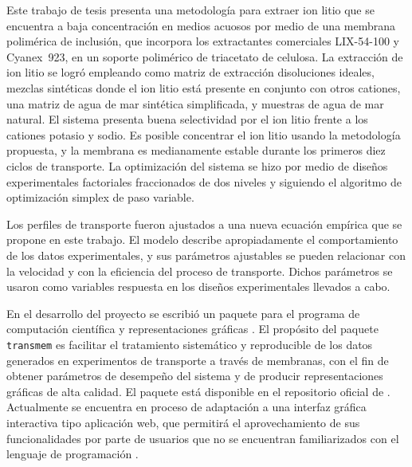 
\begin{resumen}%
Este trabajo de tesis presenta una metodología para extraer ion litio que se encuentra a baja concentración en medios acuosos por medio de una membrana polimérica de inclusión, que incorpora los extractantes comerciales LIX-54-100 y Cyanex~923, en un soporte polimérico de triacetato de celulosa. La extracción de ion litio se logró empleando como matriz de extracción disoluciones ideales, mezclas sintéticas donde el ion litio está presente en conjunto con otros cationes, una matriz de agua de mar sintética simplificada, y muestras de agua de mar natural. El sistema presenta buena selectividad por el ion litio frente a los cationes potasio y sodio. Es posible concentrar el ion litio usando la metodología propuesta, y la membrana es medianamente estable durante los primeros diez ciclos de transporte. La optimización del sistema se hizo por medio de diseños experimentales factoriales fraccionados de dos niveles y siguiendo el algoritmo de optimización simplex de paso variable.

Los perfiles de transporte fueron ajustados a una nueva ecuación empírica que se propone en este trabajo. El modelo describe apropiadamente el comportamiento de los datos experimentales, y sus parámetros ajustables se pueden relacionar con la velocidad y con la eficiencia del proceso de transporte. Dichos parámetros se usaron como variables respuesta en los diseños experimentales llevados a cabo.

En el desarrollo del proyecto se escribió un paquete para el programa de computación científica y representaciones gráficas \R. El propósito del paquete \verb|transmem| es facilitar el tratamiento sistemático y reproducible de los datos generados en experimentos de transporte a través de membranas, con el fin de obtener parámetros de desempeño del sistema y de producir representaciones gráficas de alta calidad. El paquete está disponible en el repositorio oficial de \R. Actualmente se encuentra en proceso de adaptación a una interfaz gráfica interactiva tipo aplicación web, que permitirá el aprovechamiento de sus funcionalidades por parte de usuarios que no se encuentran familiarizados con el lenguaje de programación \R.

\end{resumen}
